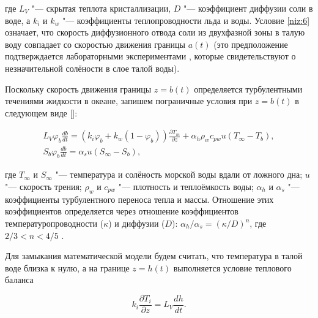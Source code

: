где $L_V$ "--- скрытая теплота кристаллизации, $D$ "--- коэффициент диффузии соли в воде, а $k_i$ и $k_w$ "--- коэффициенты теплопроводности льда и воды. Условие \eqref{niz:6} означает, что скорость диффузионного отвода соли из двухфазной зоны в талую воду совпадает со скоростью движения границы $a(t)$ (это предположение подтверждается лабораторными экспериментами \cite{niz:bib:1}, которые свидетельствуют о незначительной солёности в слое талой воды).



Поскольку скорость движения границы $z=b(t)$ определяется турбулентными течениями жидкости в океане, запишем пограничные условия при $z=b(t)$ в следующем виде []:

\begin{gather}

L_V\varphi_b\frac{db}{dt}=(k_i\varphi_b+k_w(1-\varphi_b))\frac{\partial T_m}{\partial z}+\alpha_h\rho_w c_{pw}u(T_\infty-T_b),

\label{niz:7}


\\


S_b\varphi_b\frac{db}{dt}=\alpha_s u(S_\infty-S_b),

\label{niz:8}

\end{gather}

где $T_\infty$ и $S_\infty$ "--- температура и солёность морской воды вдали от ложного дна; $u$ "--- скорость трения; $\rho_w$ и $c_{pw}$ "--- плотность и теплоёмкость воды; $\alpha_h$ и $\alpha_s$ "--- коэффициенты турбулентного переноса тепла и массы. Отношение этих коэффициентов определяется через отношение коэффициентов температуропроводности ($\kappa$) и диффузии ($D$): $\alpha_h /\alpha_s=(\kappa/D)^n$, где $2/3<n<4/5$ \cite{niz:bib:22}.



Для замыкания математической модели будем считать, что температура в талой воде близка к нулю, а на границе $z=h(t)$ выполняется условие теплового баланса

\begin{equation}

k_i\frac{\partial T_i}{\partial z}=L_V\frac{dh}{dt}.

\label{niz:9}

\end{equation}



